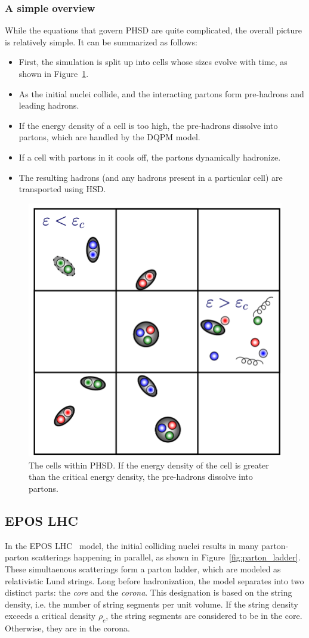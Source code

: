 \subsubsection{A simple overview}
While the equations that govern PHSD are quite complicated, the overall picture is relatively simple. It can be summarized as follows:
\begin{itemize}
    \item First, the simulation is split up into cells whose sizes evolve with time, as shown in Figure~\ref{fig:phsd_cells}.
    \item As the initial nuclei collide, and the interacting partons form pre-hadrons and leading hadrons.
    \item If the energy density of a cell is too high, the pre-hadrons dissolve into partons, which are handled by the DQPM model.
    \item If a cell with partons in it cools off, the partons dynamically hadronize.
    \item The resulting hadrons (and any hadrons present in a particular cell) are transported using HSD.
\end{itemize}

\begin{figure}
    \centering
    \includegraphics[width=0.5\linewidth]{figures/introduction/phsd_cells.png}
    \caption{The cells within PHSD. If the energy density of the cell is greater than the critical energy density, the pre-hadrons dissolve into partons.}
    \label{fig:phsd_cells}
\end{figure}

\subsection{EPOS LHC}

In the EPOS LHC~\cite{EPOSLHC} model, the initial colliding nuclei results in many parton-parton scatterings happening in parallel, as shown in Figure~\ref{fig:parton_ladder}. These simultaenous scatterings form a parton ladder, which are modeled as relativistic Lund strings. Long before hadronization, the model separates into two distinct parts: the \textit{core} and the \textit{corona}. This designation is based on the string density, i.e. the number of string segments per unit volume. If the string density exceeds a critical density $\rho_c$, the string segments are considered to be in the core. Otherwise, they are in the corona. 


